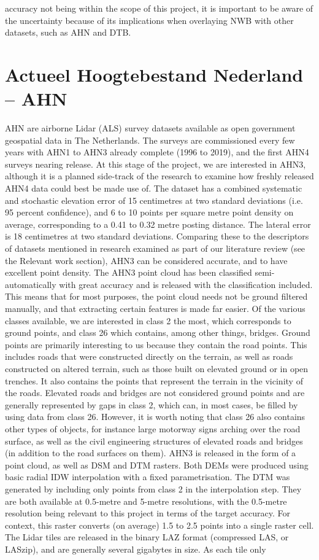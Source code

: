 accuracy not being within the scope of this project, it is important to be aware of the uncertainty because of its implications when overlaying NWB with other datasets, such as AHN and DTB.

\section*{Actueel Hoogtebestand Nederland – AHN}

AHN are airborne Lidar (ALS) survey datasets available as open government geospatial data in The Netherlands. The surveys are commissioned every few years with AHN1 to AHN3 already complete (1996 to 2019), and the first AHN4 surveys nearing release. At this stage of the project, we are interested in AHN3, although it is a planned side-track of the research to examine how freshly released AHN4 data could best be made use of. The dataset has a combined systematic and stochastic elevation error of 15 centimetres at two standard deviations (i.e. 95 percent confidence), and 6 to 10 points per square metre point density on average, corresponding to a 0.41 to 0.32 metre posting distance. The lateral error is 18 centimetres at two standard deviations. Comparing these to the descriptors of datasets mentioned in research examined as part of our literature review (see the Relevant work section), AHN3 can be considered accurate, and to have excellent point density. The AHN3 point cloud has been classified semi-automatically with great accuracy and is released with the classification included. This means that for most purposes, the point cloud needs not be ground filtered manually, and that extracting certain features is made far easier. Of the various classes available, we are interested in class 2 the most, which corresponds to ground points, and class 26 which contains, among other things, bridges. Ground points are primarily interesting to us because they contain the road points. This includes roads that were constructed directly on the terrain, as well as roads constructed on altered terrain, such as those built on elevated ground or in open trenches. It also contains the points that represent the terrain in the vicinity of the roads. Elevated roads and bridges are not considered ground points and are generally represented by gaps in class 2, which can, in most cases, be filled by using data from class 26. However, it is worth noting that class 26 also contains other types of objects, for instance large motorway signs arching over the road surface, as well as the civil engineering structures of elevated roads and bridges (in addition to the road surfaces on them). AHN3 is released in the form of a point cloud, as well as DSM and DTM rasters. Both DEMs were produced using basic radial IDW interpolation with a fixed parametrisation. The DTM was generated by including only points from class 2 in the interpolation step. They are both available at 0.5-metre and 5-metre resolutions, with the 0.5-metre resolution being relevant to this project in terms of the target accuracy. For context, this raster converts (on average) 1.5 to 2.5 points into a single raster cell. The Lidar tiles are released in the binary LAZ format (compressed LAS, or LASzip), and are generally several gigabytes in size. As each tile only 